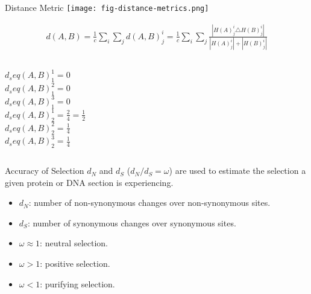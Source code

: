 \documentclass{beamer}
\begin{document}
\begin{frame}[noframenumbering]{Distance Metric} %
\texttt{[image: fig-distance-metrics.png]}

\vspace{1em}
\begin{align*}
d(A,B) = \frac{1}{c} \sum_i \sum_j d(A,B)^i_j = \frac{1}{c} \sum_i \sum_j \frac{|H(A)^i_j \triangle H(B)^i_j|}{|H(A)^i_j|+|H(B)^i_j|}
\end{align*}

\end{frame} %

\begin{frame}[noframenumbering] %
\centering{\resizebox{0.85\linewidth}{!}{%

}}

\vspace{1em}
\begin{columns}
$d_seq(A,B)^1_1=0$ \\
$d_seq(A,B)^2_1=0$ \\
$d_seq(A,B)^3_1=0$ \\
$d_seq(A,B)^1_2=\frac{2}{4}=\frac{1}{2}$ \\
$d_seq(A,B)^2_2=\frac{1}{4}$ \\
$d_seq(A,B)^3_2=\frac{1}{4}$ \\
\end{columns}
\end{frame} %

\begin{frame}[noframenumbering]{Accuracy of Selection} %
$d_N$ and $d_S$ ($d_N/d_S = \omega$) are used to estimate the selection a given protein or DNA
section is experiencing.

\vspace{1em}
\begin{itemize}
	\item $d_N$: number of non-synonymous changes over non-synonymous sites.
	\item $d_S$: number of synonymous changes over synonymous sites.
	\item $\omega \approx 1$: neutral selection.
	\item $\omega > 1$: positive selection.
	\item $\omega < 1$: purifying selection.
\end{itemize}
\end{frame} %
\end{document}
